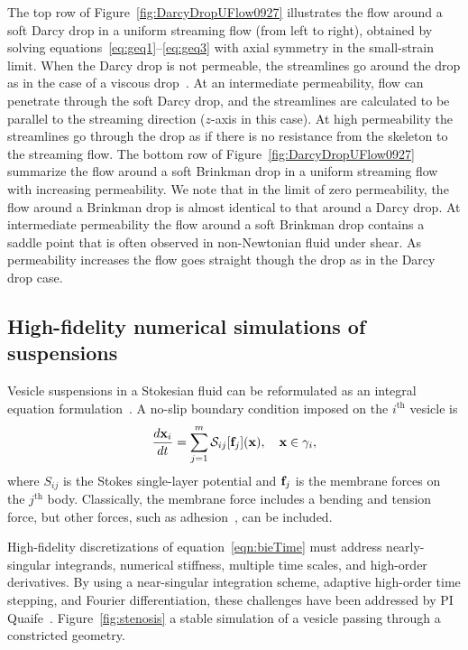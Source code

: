 \documentclass[11pt]{article}
\begin{document}
The top row of Figure~\ref{fig:DarcyDropUFlow0927} illustrates the flow
around a soft Darcy drop in a uniform streaming flow (from left to
right), obtained by solving equations~\eqref{eq:geq1}--\eqref{eq:geq3}
with axial symmetry in the small-strain limit. When the Darcy drop is
not permeable, the streamlines go around the drop as in the case of a
viscous drop~\cite{DavisStone1993_CES,
GLeal_AdvancedTransportPhenomena}. At an intermediate permeability, flow
can penetrate through the soft Darcy drop, and the streamlines are
calculated to be parallel to the streaming direction ($z$-axis in this
case). At high permeability the streamlines go through the drop as if
there is no resistance from the skeleton to the streaming flow.  The
bottom row of Figure~\ref{fig:DarcyDropUFlow0927} summarize the flow
around a soft Brinkman drop in a uniform streaming flow with increasing
permeability.  We note that in the limit of zero permeability, the flow
around a Brinkman drop is almost identical to that around a Darcy drop.
At intermediate permeability the flow around a soft Brinkman drop
contains a saddle point that is often observed in non-Newtonian fluid
under shear.  As permeability increases the flow goes straight though
the drop as in the Darcy drop case.

\subsection{High-fidelity numerical simulations of suspensions} 
\label{subsec:numerics}
Vesicle suspensions in a Stokesian fluid can be reformulated as an
integral equation formulation~\cite{qua-bir2014, qua-bir2016}. A no-slip
boundary condition imposed on the $i^{\mathrm{th}}$ vesicle is 
\begin{align}
  \frac{d\mathbf{x}_i}{dt} = \sum_{j=1}^{m} \mathcal{S}_{ij}[{\bf f}_j](\mathbf{x}), \quad \mathbf{x}
  \in \gamma_i,
  \label{eqn:bieTime}
\end{align}
where $S_{ij}$ is the Stokes single-layer potential and ${\bf f}_j$ is the
membrane forces on the $j^{\mathrm{th}}$ body. Classically, the membrane
force includes a bending and tension force, but other forces, such as
adhesion~\cite{qua-vee-you2019}, can be included.

High-fidelity discretizations of equation~\eqref{eqn:bieTime} must address
nearly-singular integrands, numerical stiffness, multiple time scales,
and high-order derivatives. By using a near-singular integration scheme,
adaptive high-order time stepping, and Fourier differentiation, these
challenges have been addressed by PI Quaife~\cite{qua-bir2014,
qua-bir2016}. Figure~\ref{fig:stenosis} a stable simulation of a vesicle
passing through a constricted geometry.
\end{document}

